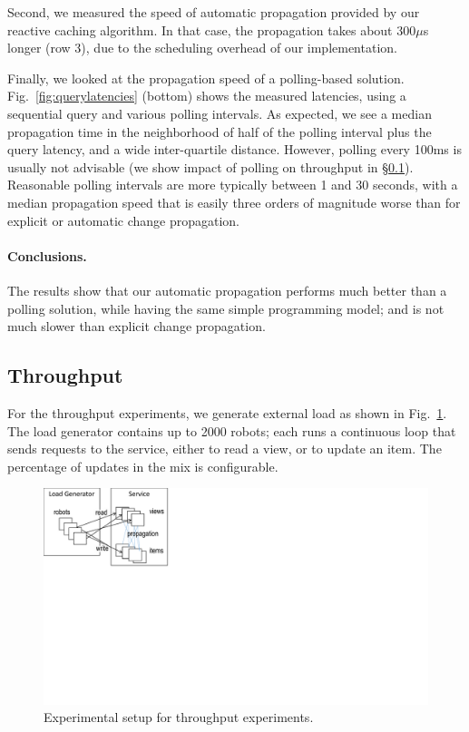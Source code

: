 Second, we measured the speed of automatic propagation provided by our reactive caching algorithm. In that case, the propagation takes about 300$\mu$s longer (row 3), due to the scheduling overhead of our implementation.

Finally, we looked at the propagation speed of a polling-based solution. Fig.~\ref{fig:querylatencies} (bottom) shows the measured latencies, using a sequential query and various polling intervals. As expected, we see a median propagation time in the neighborhood of half of the polling interval plus the query latency, and a wide inter-quartile distance. However, polling every 100ms is usually not advisable (we show impact of polling on throughput in \S\ref{sec:throughput}). Reasonable polling intervals are more typically between 1 and 30 seconds, with a median propagation speed that is easily three orders of magnitude worse than for explicit or automatic change propagation.  

\paragraph{Conclusions.} The results show that our automatic propagation performs much better than a polling solution, while having the same simple programming model; and is not much slower than explicit change propagation.


\subsection{Throughput}\label{sec:throughput}

For the throughput experiments, we generate external load as shown in Fig.~\ref{fig:tp-setup}. The load generator contains up to 2000 robots; each runs a continuous loop that sends requests to the service, either to read a view, or to update an item. The percentage of updates in the mix is configurable. 

\begin{figure}
\centering
\includegraphics[scale=.5, viewport=0 346 309 540]{figs/tp-setup} 
\caption{Experimental setup for throughput experiments.}\label{fig:tp-setup}
\end{figure}

